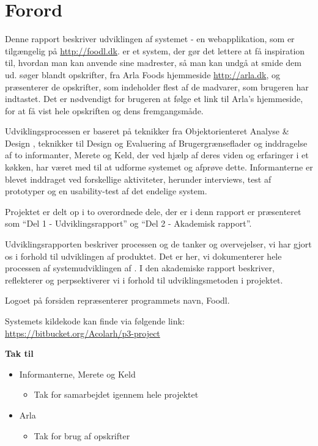 \chapter*{Forord}
Denne rapport beskriver udviklingen af systemet \Foodl{} - en webapplikation, som er tilgængelig på \url{http://foodl.dk}. \Foodl{} er et system, der gør det lettere at få inspiration til, hvordan man kan anvende sine madrester, så man kan undgå at smide dem ud. \Foodl{} søger blandt opskrifter, fra Arla Foods hjemmeside \url{http://arla.dk}, og præsenterer de opskrifter, som indeholder flest af de madvarer, som brugeren har indtastet. Det er nødvendigt for brugeren at følge et link til Arla's hjemmeside, for at få vist hele opskriften og dens fremgangsmåde.

Udviklingsprocessen er baseret på teknikker fra Objektorienteret Analyse \& Design \cite{ooad}, teknikker til Design og Evaluering af Brugergrænseflader \cite{deb} og inddragelse af to informanter, Merete og Keld, der ved hjælp af deres viden og erfaringer i et køkken, har været med til at udforme systemet og afprøve dette. Informanterne er blevet inddraget ved forskellige aktiviteter, herunder interviews, test af prototyper og en usability-test af det endelige system.

Projektet er delt op i to overordnede dele, der er i denn rapport er præsenteret som ``Del 1 - Udviklingsrapport'' og ``Del 2 - Akademisk rapport''. 

Udviklingsrapporten beskriver processen og de tanker og overvejelser, vi har gjort os i forhold til udviklingen af produktet. Det er her, vi dokumenterer hele processen af systemudviklingen af \Foodl{}. I den akademiske rapport beskriver, reflekterer og perpsektiverer vi i forhold til udviklingsmetoden i projektet.

Logoet på forsiden repræsenterer programmets navn, Foodl.

Systemets kildekode kan finde via følgende link: \url{https://bitbucket.org/Acolarh/p3-project}

\textbf{Tak til}
\begin{itemize}[noitemsep]
	\item Informanterne, Merete og Keld
	\begin{itemize}[noitemsep]
		\item Tak for samarbejdet igennem hele projektet
	\end{itemize}
	\item Arla
	\begin{itemize}[noitemsep]
		\item Tak for brug af opskrifter
	\end{itemize}
\end{itemize}